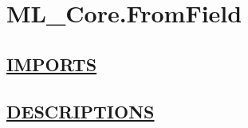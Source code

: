 \chapter*{ML\_Core.FromField}
\hypertarget{ecldoc:toc:ML_Core.FromField}{}

\section*{\underline{IMPORTS}}

\section*{\underline{DESCRIPTIONS}}
